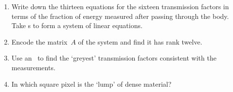 \begin{exercise}
\setbox\ajrqrbox\hbox{}%
\marginajrbox%
\begin{enumerate}
\item Write down the thirteen equations for the sixteen transmission factors in terms of the fraction of  energy measured after passing through the body.
Take s to form a system of linear equations.
\item Encode the matrix~\(A\) of the system and find it has rank twelve.
\item Use an \svd\ to find the `greyest' transmission factors consistent with the measurements.
\item In which square pixel is the `lump' of dense material?
\end{enumerate}
\end{exercise}










